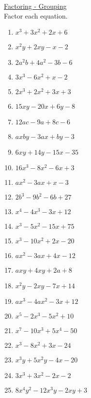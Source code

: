 \documentclass{article}
\begin{document}
\newpage
\underline{Factoring - Grouping} \\
Factor each equation. \\
\begin{enumerate}
\item $x^{3} + 3x^{2} + 2x + 6$
\item $x^{2}y + 2xy - x - 2$
\item $2a^{2}b + 4a^{2} - 3b - 6$
\item $3x^{3} - 6x^{2} + x - 2$
\item $2x^{3} + 2x^{2} + 3x + 3$
\item $15xy - 20x + 6y - 8$
\item $12ac - 9a + 8c - 6$
\item $axby - 3ax + by - 3$
\item $6xy + 14y - 15x - 35$
\item $16x^{3} - 8x^{2} - 6x + 3$
\item $ax^{2} - 3ax + x - 3$
\item $2b^{3} - 9b^{2} - 6b + 27$
\item $x^{4} - 4x^{3} - 3x + 12$
\item $x^{3} - 5x^{2} - 15x + 75$
\item $x^{3} - 10x^{2} + 2x - 20$
\item $ax^{2} - 3ax + 4x - 12$
\item $axy + 4xy + 2a + 8$
\item $x^{2}y - 2xy - 7x + 14$
\item $ax^{3} - 4ax^{2} - 3x + 12$
\item $x^{5} - 2x^{3} - 5x^{2} + 10$
\item $x^{7} - 10x^{3} + 5x^{4} - 50$
\item $x^{3} - 8x^{2} + 3x - 24$
\item $x^{3}y + 5x^{2}y - 4x - 20$
\item $3x^{3} + 3x^{2} - 2x - 2$
\item $8x^{4}y^{2} - 12x^{3}y - 2xy + 3$
\end{enumerate}
\end{document}
